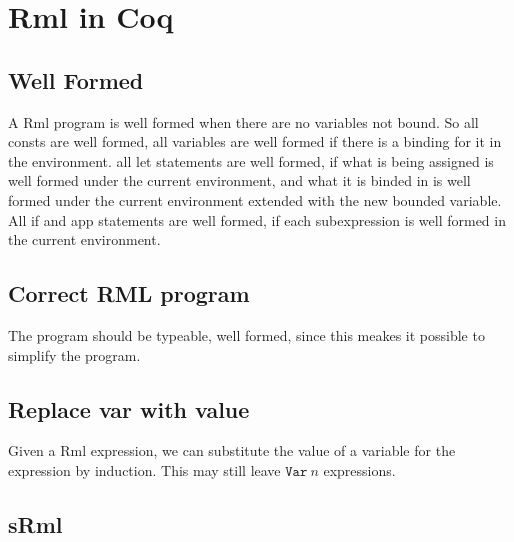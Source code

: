 \documentclass[11pt, leqno]{article}
\begin{document}
\section{Rml in Coq}

\subsection{Well Formed}
A Rml program is well formed when there are no variables not bound. So all consts are well formed, all variables are well formed if there is a binding for it in the environment. all let statements are well formed, if what is being assigned is well formed under the current environment, and what it is binded in is well formed under the current environment extended with the new bounded variable. All if and app statements are well formed, if each subexpression is well formed in the current environment.

\subsection{Correct RML program}
The program should be typeable, well formed, since this meakes it possible to simplify the program.

\subsection{Replace var with value}
Given a Rml expression, we can substitute the value of a variable for the expression by induction. This may still leave \(\mathtt{Var}~n\) expressions.

\subsection{sRml}
\end{document}
